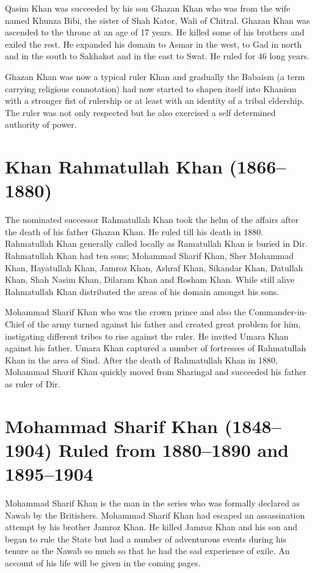 \documentclass[twoside,openright]{book}
\begin{document}
Qasim Khan was succeeded by his son Ghazan Khan who was from
the wife named Khunza Bibi, the sister of Shah Kator, Wali of
Chitral. Ghazan Khan was ascended to the throne at an age of 17
years. He killed some of his brothers and exiled the rest. He
expanded his domain to Asmar in the west, to Gad in north and in
the south to Sakhakot and in the east to Swat. He ruled for 46
long years.

Ghazan Khan was now a typical ruler Khan and gradually the Babaism (a term
carrying religious connotation) had now started to shapen itself into Khanism
with a stronger fist of rulership or at least with an identity of a tribal
eldership. The ruler was not only respected but he also exercised a self
determined authority of power.

\section{Khan Rahmatullah Khan (1866--1880)}

The nominated successor Rahmatullah Khan took the helm of the affairs after the
death of his father Ghazan Khan. He ruled till his death in 1880. Rahmatullah
Khan generally called locally as Ramatullah Khan is buried in Dir. Rahmatullah
Khan had ten sons; Mohammad Sharif Khan, Sher Mohammad Khan, Hayatullah Khan,
Jamroz Khan, Ashraf Khan, Sikandar Khan, Datullah Khan, Shah Nasim Khan, Dilaram
Khan and Rosham Khan. While still alive Rahmatullah Khan distributed the areas
of his domain amongst his sons.

Mohammad Sharif Khan who was the crown prince and also the Commander-in-Chief of
the army turned against his father and created great problem for him,
instigating different tribes to rise against the ruler. He invited Umara Khan
against his father. Umara Khan captured a number of fortresses of Rahmatullah
Khan in the area of Sind. After the death of Rahmatullah Khan in 1880, Mohammad
Sharif Khan quickly moved from Sharingal and succeeded his father as ruler of
Dir.

\section{Mohammad Sharif Khan (1848--1904) Ruled from 1880--1890 and 1895--1904}

Mohammad Sharif Khan is the man in the series who was formally declared as Nawab
by the Britishers. Mohammad Sharif Khan had escaped an assassination attempt by
his brother Jamroz Khan. He killed Jamroz Khan and his son and began to rule the
State but had a number of adventurous events during his tenure as the Nawab so
much so that he had the sad experience of exile. An account of his life will be
given in the coming pages.
\end{document}
